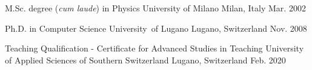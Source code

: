 \begin{cventries}
\cventry
{M.Sc. degree (\emph{cum laude}) in Physics}
{University of Milano}
{Milan, Italy}
{Mar. 2002}
{}

\cventry
{Ph.D. in Computer Science}
{University\ of Lugano}
{Lugano, Switzerland}
{Nov. 2008}
{}

\cventry
{Teaching Qualification - Certificate for Advanced Studies in Teaching}
{University of Applied Sciences of Southern Switzerland}
{Lugano, Switzerland}
{Feb. 2020}
{}


\end{cventries}
